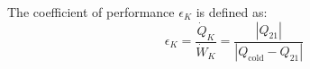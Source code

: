 The coefficient of performance \( \epsilon_K \) is defined as:  
\[
\epsilon_K = \frac{\dot{Q}_K}{\dot{W}_K} = \frac{|Q_{21}|}{|Q_{\text{cold}} - Q_{21}|}
\]